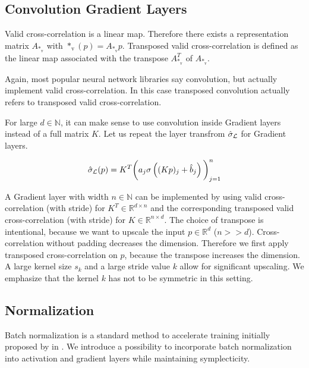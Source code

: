 \documentclass[twoside,a4paper]{article}
\begin{document}
\subsection{Convolution Gradient Layers}

Valid cross-correlation is a linear map. Therefore
there exists a representation matrix $A_{*_{\text{v}}}$ with $*_{\text{v}}(p) = A_{*_{\text{v}}}p$.
Transposed valid cross-correlation 
is defined as the linear map associated with the transpose $A_{*_{\text{v}}}^T$ of $A_{*_{\text{v}}}$.

Again, most popular neural network libraries say convolution, but actually implement
valid cross-correlation. In this case transposed convolution actually refers to
transposed valid cross-correlation.

For large $d \in \mathbb{N}$, it can make sense to use convolution inside Gradient layers 
instead of a full matrix $K$. Let us repeat the layer transfrom $\hat{\sigma}_{\mathcal{L}}$ for Gradient layers.

\begin{equation*}
	\hat{\sigma}_{\mathcal{L}}(p) = K^T \bigg( a_j \sigma \left( (Kp)_j + \hat{b}_j \right) \bigg)_{j=1}^n
\end{equation*}

A Gradient layer with width $n \in \mathbb{N}$ can be implemented by 
using valid cross-correlation (with stride) for $K^T \in \mathbb{R}^{d \times n}$ and the
corresponding transposed valid cross-correlation (with stride) for $K \in \mathbb{R}^{n \times d}$.
The choice of transpose is intentional, because we want to upscale the input $p \in \mathbb{R}^d$ ($n >> d$). 
Cross-correlation without padding decreases the dimension. Therefore we first apply 
transposed cross-correlation on $p$, because the transpose increases the dimension.
A large kernel size $s_k$ and a large stride value $k$ allow for significant upscaling.
We emphasize that the kernel $k$ has not to be symmetric in this setting.

\subsection{Normalization}

Batch normalization is a standard method to accelerate training initially proposed by
\citeauthor{batchnorm-ioffe15} in \cite{batchnorm-ioffe15}. 
We introduce a possibility to incorporate batch normalization
into activation and gradient layers while maintaining symplecticity.
\end{document}
